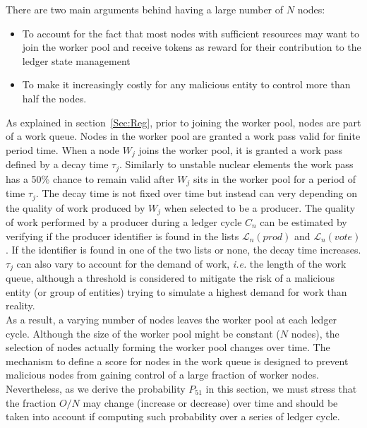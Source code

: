 There are two main arguments behind having a large number of $N$ nodes:

\begin{itemize}
 \item To account for the fact that most nodes with sufficient resources may want to join the worker pool and receive tokens as reward for their contribution to the ledger state management
\item To make it increasingly costly for any malicious entity to control more than half the nodes.
\end{itemize}

As explained in section~\ref{Sec:Reg}, prior to joining the worker pool, nodes are part of a work queue. Nodes in the worker pool are granted a work pass valid for finite period time. When a node $W_j$ joins the worker pool, it is granted a work pass defined by a decay time $\tau_j$. Similarly to unstable nuclear elements the work pass has a 50\% chance to remain valid after $W_j$ sits in the worker pool for a period of time $\tau_j$. The decay time is not fixed over time but instead can very depending on the quality of work produced by $W_j$ when selected to be a producer. The quality of work performed by a producer during a ledger cycle $C_n$ can be estimated by verifying if the producer identifier is found in the lists $\mathcal{L}_n(prod)$ and $\mathcal{L}_n(vote)$. If the identifier is found in one of the two lists or none, the decay time increases. 
$\tau_j$ can also vary to account for the demand of work, \textit{i.e.} the length of the work queue, although a threshold is considered to mitigate the risk of a malicious entity (or group of entities) trying to simulate a highest demand for work than reality.\\ 

As a result, a varying number of nodes leaves the worker pool at each ledger cycle. Although the size of the worker pool might be constant ($N$ nodes), the selection of nodes actually forming the worker pool changes over time. The mechanism to define a score for nodes in the work queue is designed to prevent malicious nodes from gaining control of a large fraction of worker nodes. Nevertheless, as we derive the probability $P_{51}$ in this section, we must stress that the fraction $O/N$ may change (increase or decrease) over time and should be taken into account if computing such probability over a series of ledger cycle.\\

